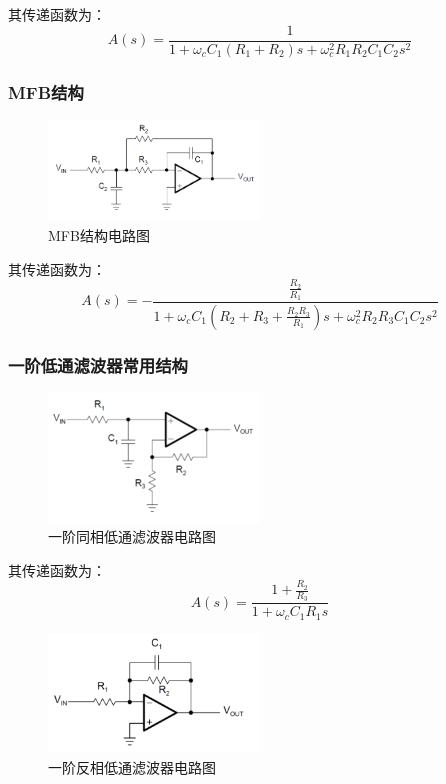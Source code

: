 \documentclass[UTF8]{ctexart}
\begin{document}
其传递函数为：
\begin{equation}
A(s)=\frac{1}{1+\omega_cC_1(R_1+R_2)s+\omega_c^2R_1R_2C_1C_2s^2}
\end{equation}

\subsubsection{MFB结构}
\begin{figure}[H]
\centering
\includegraphics[width=0.5\textwidth]{3.png}
\caption{MFB结构电路图}
\end{figure}

其传递函数为：
\begin{equation}
A(s)=-\frac{\frac{R_2}{R_1}}{1+\omega_cC_1(R_2+R_3+\frac{R_2R_3}{R_1})s+\omega_c^2R_2R_3C_1C_2s^2}
\end{equation}

\subsubsection{一阶低通滤波器常用结构}
\begin{figure}[H]
\centering
\includegraphics[width=0.5\textwidth]{4.png}
\caption{一阶同相低通滤波器电路图}
\end{figure}

其传递函数为：
\begin{equation}
A(s)=\frac{1+\frac{R_2}{R_3}}{1+\omega_cC_1R_1s}
\end{equation}

\begin{figure}[H]
\centering
\includegraphics[width=0.5\textwidth]{5.png}
\caption{一阶反相低通滤波器电路图}
\end{figure}
\end{document}
